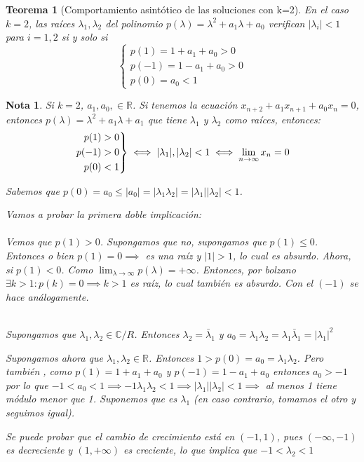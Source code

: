\documentclass[11pt, a4paper, titlepage]{article}
\newcommand{\R}{\mathbb{R}}
\theoremstyle{theorem-style}
\newtheorem*{nth}{Teorema}
\theoremstyle{definition-style}
\theoremstyle{remark-style}
\newtheorem*{nota}{Nota}
\theoremstyle{example-style}
\newenvironment{rcases}
  {\left.\begin{aligned}}
  {\end{aligned}\right\rbrace}
\begin{document}
       \begin{nth}[Comportamiento asintótico de las soluciones con k=2]
        En el caso $k = 2$, las raíces $\lambda_{1}, \lambda_{2}$ del polinomio
        $p(\lambda) = \lambda^2 + a_{1}\lambda + a_{0}$ verifican $|\lambda_{i}|
        < 1$ para $i = 1, 2$ si y solo si
        $$
        \begin{cases}
          p(1) = 1 + a_{1} + a_{0} > 0 \\
          p(-1) = 1 - a_{1} + a_{0} > 0 \\
          p(0) = a_{0} < 1
        \end{cases}
        $$
      \end{nth}

\begin{nota}
	Si $k=2$, $a_1,a_0 ,\in \R$. Si tenemos la ecuación $x_{n+2} + a_1 x _{n+1}	+ a_0 x_n =0$, entonces $p(\lambda) = \lambda^2 + a_1 \lambda + a_1$ que tiene $\lambda_1 $ y $\lambda_2$ como raíces, entonces:
	\[
	\begin{rcases}
	p(1) > 0\\
	p(-1) > 0\\
	p(0) < 1
\end{rcases} \iff |\lambda_1|,|\lambda_2| < 1 \iff \lim_{n\to \infty } x_n  = 0
	\]
	
	Sabemos que $p(0) = a_0 \leq |a_0| = |\lambda_1 \lambda_2| = |\lambda_1||\lambda_2| < 1$.
	
	Vamos a probar la primera doble implicación:\\
	\boxed{\Rightarrow}\hfill \\	
	Vemos que $p(1)> 0$. Supongamos que no, supongamos que $p(1) \leq 0$. Entonces o bien $p(1) = 0\implies $ es una raíz y $|1|>1$, lo cual es absurdo. Ahora, si $p(1) < 0$. Como $\lim_{\lambda \to \infty} p(\lambda) = + \infty$. Entonces, por bolzano $\exists k > 1 : p(k) = 0 \implies k > 1$ es raíz, lo cual también es absurdo. Con el $(-1)$ se hace análogamente.
	
	\boxed{\Leftarrow}\hfill \\
	Supongamos que $\lambda_1, \lambda_2 \in \mathbb C\slash R$. Entonces $\lambda_2 = \bar \lambda_1$ y $a_0 = \lambda_1 \lambda_2 = \lambda_1 \bar \lambda_1 = |\lambda_1|^2$
	
	Supongamos ahora que $\lambda_1,\lambda_2 \in \R$. Entonces $1 > p(0) = a_0 = \lambda_1 \lambda_2$. Pero también , como $p(1) = 1+a_1+a_0$ y $p(-1) = 1-a_1+a_0$ entonces $a_0 > -1$ por lo que $-1 < a_0 < 1\implies -1 \lambda_1 \lambda_2 < 1 \implies |\lambda_1||\lambda_2| < 1 \implies$ al menos 1 tiene módulo menor que 1. Suponemos que es $\lambda_1$ (en caso contrario, tomamos el otro y seguimos igual).
	
	Se puede probar que el cambio de crecimiento está en $(-1,1)$, pues $(-\infty,-1)$ es decreciente y $(1,+\infty)$ es creciente, lo que implica que $-1 < \lambda_2 < 1$
\end{nota}
\end{document}
